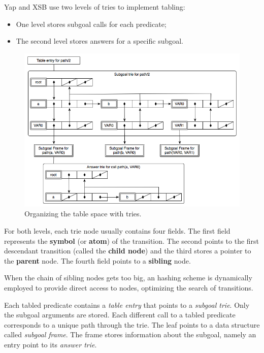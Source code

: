   Yap and XSB use two levels of tries to implement tabling:
  
  \begin{itemize}
    \item One level stores subgoal calls for each predicate;
    \item The second level stores answers for a specific subgoal.
  \end{itemize}
  
  \begin{figure}[ht]
     \centering
       \includegraphics[scale=0.6]{two_level_tries.png}
     \caption{Organizing the table space with tries.}
     \label{fig:table_space_tries}
   \end{figure}
  
  For both levels, each trie node usually contains four fields. The first field represents the \textbf{symbol} (or \textbf{atom})
  of the transition. The second points to the first descendant transition (called the \textbf{child node})
  and the third stores a pointer to the \textbf{parent} node.
  The fourth field points to a \textbf{sibling} node.
  
  When the chain of sibling nodes gets too big, an hashing scheme is dynamically employed to provide direct
  access to nodes, optimizing the search of transitions.
  
  Each tabled predicate contains a \textit{table entry} that points to a \textit{subgoal trie}.
  Only the subgoal arguments are stored.
  Each different call to a tabled predicate corresponds to a unique path through the trie.
  The leaf points to a data structure called \textit{subgoal frame}. The frame stores
  information about the subgoal, namely an entry point to its \textit{answer trie}.
  
